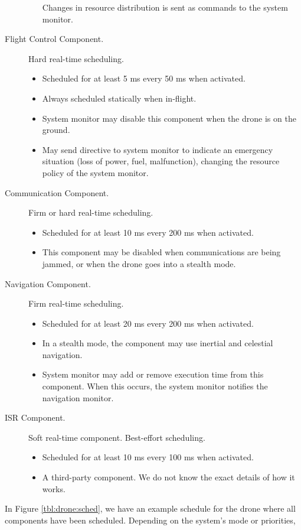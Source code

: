\begin{description}
\begin{itemize}
				Changes in resource distribution is sent as commands to the system monitor.
		\end{itemize}
	\item[Flight Control Component.] Hard real-time scheduling. 
		\begin{itemize}
			\item Scheduled for at least 5 ms every 50 ms when activated.
			\item Always scheduled statically when in-flight.
			\item System monitor may disable this component when the drone is on the ground.
			\item May send directive to system monitor to indicate an emergency situation (loss of power, fuel, malfunction), changing the resource policy of the system monitor.
		\end{itemize}
	\item[Communication Component.] Firm or hard real-time scheduling.
		\begin{itemize}
			\item Scheduled for at least 10 ms every 200 ms when activated.
			\item This component may be disabled when communications are being jammed, or when the drone goes into a stealth mode.
		\end{itemize}
	\item[Navigation Component.] Firm real-time scheduling. 
		\begin{itemize}
			\item Scheduled for at least 20 ms every 200 ms when activated.
			\item In a stealth mode, the component may use inertial and celestial navigation.
			\item System monitor may add or remove execution time from this component. When this occurs, the system monitor notifies the navigation monitor.
		\end{itemize}
	\item [ISR Component.] Soft real-time component. Best-effort scheduling. 
		\begin{itemize}
			\item Scheduled for at least 10 ms every 100 ms when activated.
			\item A third-party component. We do not know the exact details of how it works.
		\end{itemize}
\end{description}

In Figure \ref{tbl:drone:sched}, we have an example schedule for the drone where all components have been scheduled. 
Depending on the system's mode or priorities, 

